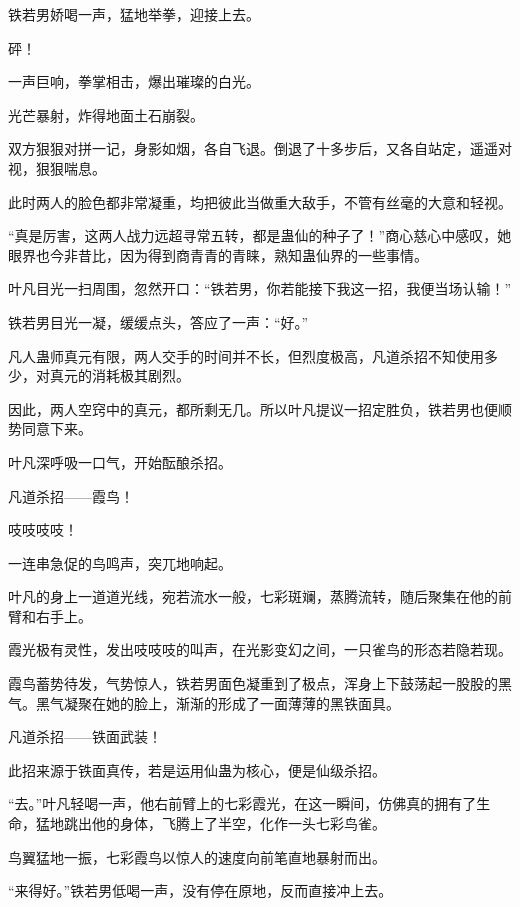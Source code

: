 
\begin{this_body}



铁若男娇喝一声，猛地举拳，迎接上去。

砰！

一声巨响，拳掌相击，爆出璀璨的白光。

光芒暴射，炸得地面土石崩裂。

双方狠狠对拼一记，身影如烟，各自飞退。倒退了十多步后，又各自站定，遥遥对视，狠狠喘息。

此时两人的脸色都非常凝重，均把彼此当做重大敌手，不管有丝毫的大意和轻视。

“真是厉害，这两人战力远超寻常五转，都是蛊仙的种子了！”商心慈心中感叹，她眼界也今非昔比，因为得到商青青的青睐，熟知蛊仙界的一些事情。

叶凡目光一扫周围，忽然开口：“铁若男，你若能接下我这一招，我便当场认输！”

铁若男目光一凝，缓缓点头，答应了一声：“好。”

凡人蛊师真元有限，两人交手的时间并不长，但烈度极高，凡道杀招不知使用多少，对真元的消耗极其剧烈。

因此，两人空窍中的真元，都所剩无几。所以叶凡提议一招定胜负，铁若男也便顺势同意下来。

叶凡深呼吸一口气，开始酝酿杀招。

凡道杀招——霞鸟！

吱吱吱吱！

一连串急促的鸟鸣声，突兀地响起。

叶凡的身上一道道光线，宛若流水一般，七彩斑斓，蒸腾流转，随后聚集在他的前臂和右手上。

霞光极有灵性，发出吱吱吱的叫声，在光影变幻之间，一只雀鸟的形态若隐若现。

霞鸟蓄势待发，气势惊人，铁若男面色凝重到了极点，浑身上下鼓荡起一股股的黑气。黑气凝聚在她的脸上，渐渐的形成了一面薄薄的黑铁面具。

凡道杀招——铁面武装！

此招来源于铁面真传，若是运用仙蛊为核心，便是仙级杀招。

“去。”叶凡轻喝一声，他右前臂上的七彩霞光，在这一瞬间，仿佛真的拥有了生命，猛地跳出他的身体，飞腾上了半空，化作一头七彩鸟雀。

鸟翼猛地一振，七彩霞鸟以惊人的速度向前笔直地暴射而出。

“来得好。”铁若男低喝一声，没有停在原地，反而直接冲上去。


\end{this_body}
